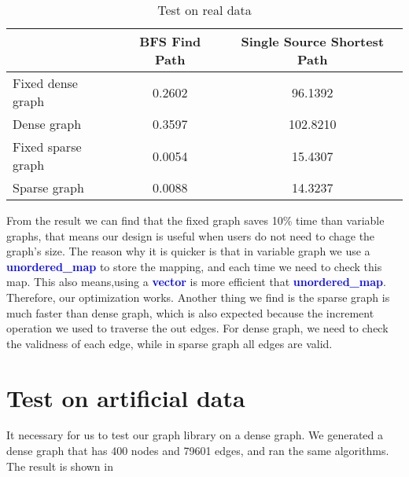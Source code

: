 \documentclass{article}
\begin{document}
    	\begin{table}
	\begin{center}
		\begin{tabular}{|l|c|c|}
			\hline
			 & BFS Find Path & Single Source Shortest Path\\
			\hline
			\hline 
			Fixed dense graph & 0.2602 & 96.1392\\
			\hline
			Dense graph &  0.3597 & 102.8210\\
			\hline
			Fixed sparse graph&  0.0054& 15.4307\\
			\hline
			Sparse graph &  0.0088 & 14.3237\\
			\hline
		\end{tabular}
	\end{center}
	\caption{Test on real data}
	\label{tab:test1}
	\end{table}
From the result we can find that the fixed graph saves 10\% time than variable graphs, that means our design is useful when users do not need to chage the graph's size. The reason why it is quicker is that in variable graph we use a \textbf{\textcolor{blue}{unordered\_map}} to store the mapping, and each time we need to check this map. This also means,using a \textbf{\textcolor{blue}{vector}} is more efficient that \textbf{\textcolor{blue}{unordered\_map}}. Therefore, our optimization works. Another thing we find is the sparse graph is much faster than dense graph, which is also expected because the increment operation we used to traverse the out edges. For dense graph, we need to check the validness of each edge, while in sparse graph all edges are valid.
   \section{Test on artificial data}
   It necessary for us to test our graph library on a dense graph. We generated a dense graph that has 400 nodes and 79601 edges, and ran the same algorithms. The result is shown in  
   
\end{document}

